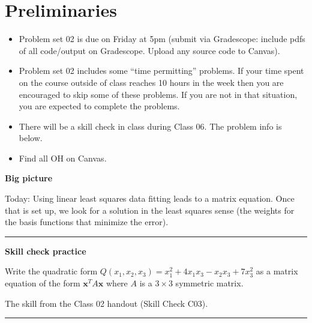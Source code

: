 \documentclass[12pt,letterpaper,noanswers]{exam}
\newcommand{\vc}[1]{\boldsymbol{#1}}
\begin{document}
 \pdfpageheight 11in 
  \pdfpagewidth 8.5in

\noindent 



\section{Preliminaries}
\begin{itemize}
\itemsep0pt
\item Problem set 02 is due on Friday at 5pm (submit via Gradescope: include pdfs of all code/output on Gradescope.  Upload any source code to Canvas).
\item Problem set 02 includes some ``time permitting'' problems.  If your time spent on the course outside of class reaches 10 hours in the week then you are encouraged to skip some of these problems.  If you are not in that situation, you are expected to complete the problems.
\item There will be a skill check in class during Class 06.  The problem info is below.
\item Find all OH on Canvas.
\end{itemize}



\noindent\textbf{Big picture}

Today: Using linear least squares data fitting leads to a matrix equation.  Once that is set up, we look for a solution in the least squares sense (the weights for the basis functions that minimize the error).

\vspace{0.2cm}
\hrule
\vspace{0.2cm}

\noindent \textbf{Skill check practice}
\begin{questions}
\item Write the quadratic form $Q(x_1,x_2,x_3) = x_1^2 + 4x_1x_3 - x_2x_3 + 7x_3^2$ as a matrix equation of the form $\vc{x}^TA\vc{x}$ where $A$ is a $3\times 3$ symmetric matrix.
\item The skill from the Class 02 handout (Skill Check C03).
\end{questions}


\vspace{0.2cm}
\hrule
\vspace{0.2cm}
\end{document}

